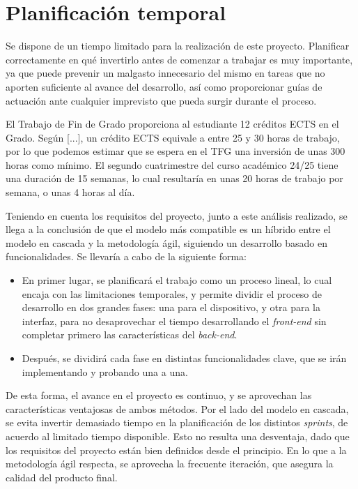 \section{Planificación temporal}

Se dispone de un tiempo limitado para la realización de este proyecto. Planificar correctamente en qué invertirlo antes de comenzar a trabajar es muy importante, ya que puede prevenir un malgasto innecesario del mismo en tareas que no aporten suficiente al avance del desarrollo, así como proporcionar guías de actuación ante cualquier imprevisto que pueda surgir durante el proceso.

El Trabajo de Fin de Grado proporciona al estudiante 12 créditos ECTS en el Grado. Según [...], un crédito ECTS equivale a entre 25 y 30 horas de trabajo, por lo que podemos estimar que se espera en el TFG una inversión de unas 300 horas como mínimo. El segundo cuatrimestre del curso académico 24/25 tiene una duración de 15 semanas, lo cual resultaría en unas 20 horas de trabajo por semana, o unas 4 horas al día.

Teniendo en cuenta los requisitos del proyecto, junto a este análisis realizado, se llega a la conclusión de que el modelo más compatible es un híbrido entre el modelo en cascada y la metodología ágil, siguiendo un desarrollo basado en funcionalidades. Se llevaría a cabo de la siguiente forma:

\begin{itemize}
    \item En primer lugar, se planificará el trabajo como un proceso lineal, lo cual encaja con las limitaciones temporales, y permite dividir el proceso de desarrollo en dos grandes fases: una para el dispositivo, y otra para la interfaz, para no desaprovechar el tiempo desarrollando el \textit{front-end} sin completar primero las características del \textit{back-end}.
    \item Después, se dividirá cada fase en distintas funcionalidades clave, que se irán implementando y probando una a una.
\end{itemize}

De esta forma, el avance en el proyecto es continuo, y se aprovechan las características ventajosas de ambos métodos. Por el lado del modelo en cascada, se evita invertir demasiado tiempo en la planificación de los distintos \textit{sprints}, de acuerdo al limitado tiempo disponible. Esto no resulta una desventaja, dado que los requisitos del proyecto están bien definidos desde el principio. En lo que a la metodología ágil respecta, se aprovecha la frecuente iteración, que asegura la calidad del producto final.

